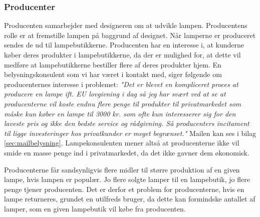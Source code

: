 \subsubsection{Producenter}
Producenten samarbejder med designeren om at udvikle lampen. Producentens rolle er at fremstille lampen på baggrund af designet. Når lamperne er produceret sendes de ud til lampebutikkerne. Producenten har en interesse i, at kunderne køber deres produkter i lampebutikkerne, da der er mulighed for, at dette vil medføre at lampebutikkerne bestiller flere af deres produkter hjem. En belysningskonsulent som vi har været i kontakt med, siger følgende om producenternes interesse i problemet: \textit{"Det er blevet en kompliceret proces at producere en lampe ift. EU lovgivning i dag så jeg har svært ved at se at producenterne vil koste endnu flere penge til produkter til privatmarkedet som måske kun køber en lampe til 3000 kr. som ofte kun interesserer sig for den laveste pris og ikke den bedste service og rådgivning. Så producenters incitament til ligge investeringer hos privatkunder er meget begrænset."} Mailen kan ses i bilag \ref{sec:mailbelysning}. Lampekonsulenten mener altså at producenterne ikke vil smide en masse penge ind i privatmarkedet, da det ikke gavner dem økonomisk. 

Producenterne får sandsynligvis flere midler til større produktion af en given lampe, hvis lampen er populær. Jo flere solgte lamper til en lampebutik, jo flere penge tjener producenten. Det er derfor et problem for producenterne, hvis en lampe returneres, grundet en utilfreds bruger, da dette kan formindske antallet af lamper, som en given lampebutik vil købe fra producenten.
